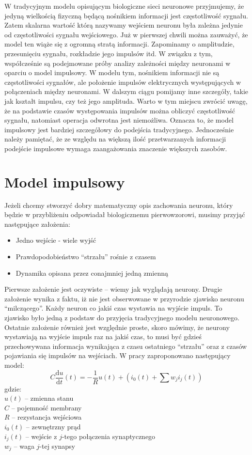 W tradycyjnym modelu opisującym biologiczne sieci neuronowe przyjmujemy, że jedyną wielkością fizyczną 
będącą nośnikiem informacji jest częstotliwość sygnału. Zatem skalarna wartość którą nazywamy wejściem
neuronu była zależna jedynie od częstotliwości sygnału wejściowego. 
Już w pierwszej chwili można zauważyć,
że model ten wiąże się z ogromną stratą informacji. 
Zapominamy o amplitudzie, przesunięciu sygnału, 
rozkładzie jego impulsów itd. 
W związku z tym, współcześnie są podejmowane próby analizy zależności między neuronami
w oparciu o model impulsowy. 
W modelu tym, nośnikiem informacji nie są częstotliwości sygnałów, 
ale położenie impulsów elektrycznych występujących w połączeniach między neuronami. 
W dalszym ciągu pomijamy inne szczegóły, takie jak kształt impulsu, czy też jego amplituda.
Warto w tym miejscu zwrócić uwagę, że na podstawie czasów występowania impulsów można obliczyć
częstotliwość sygnału, natomiast operacja odwrotna jest niemożliwa. 
Oznacza to, że model impulsowy jest bardziej szczegółowy do podejścia tradycyjnego.
Jednocześnie należy pamiętać, że ze względu na większą ilość przetwarzanych informacji podejście impulsowe wymaga zaangażowania 
znaczenie większych zasobów.

\section{Model impulsowy}
Jeżeli chcemy stworzyć dobry matematyczny opis zachowania neuronu, który będzie w przybliżeniu odpowiadał biologicznemu pierwowzorowi, 
musimy przyjąć następujące założenia:
\begin {itemize}
\item Jedno wejście - wiele wyjść
\item Prawdopodobieństwo “strzału” rośnie z czasem
\item Dynamika opisana przez conajmniej jedną zmienną
\end {itemize}
Pierwsze założenie jest oczywiste -- wiemy jak wyglądają neurony. 
Drugie założenie wynika z faktu, iż nie jest obserwowane w przyrodzie zjawisko neuronu ``milczącego''. 
Każdy neuron co jakiś czas wystawia na wyjście impuls. To zjawisko było jedną z podstaw do przyjęcia tradycyjnego modelu neuronowego.
Ostatnie założenie również jest względnie proste, skoro mówimy, że neurony wystawiają na wyjście impuls raz na jakiś czas, to musi być gdzieś
przechowywana informacja wynikająca z czasu ostatniego ``strzału'' oraz z czasów pojawiania się impulsów na wejściach. 
W pracy \cite{ponulak} zaproponowano następujący model:
    $$ C\frac{\mathrm{d}u}{\mathrm{d}t} (t) = -\frac1Ru(t)+\left(i_0(t) + \sum{w_ji_j(t)}\right)$$ 
gdzie: \\
    $u(t)$ -- zmienna stanu \\ 
    $C$ -- pojemność membrany \\
    $R$ -- rezystancja wejściowa\\
    $i_0(t)$ -- zewnętrzny prąd \\
    $i_j(t)$ -- wejście z $j$-tego połączenia synaptycznego\\
    $w_j$ -- waga $j$-tej synapsy

